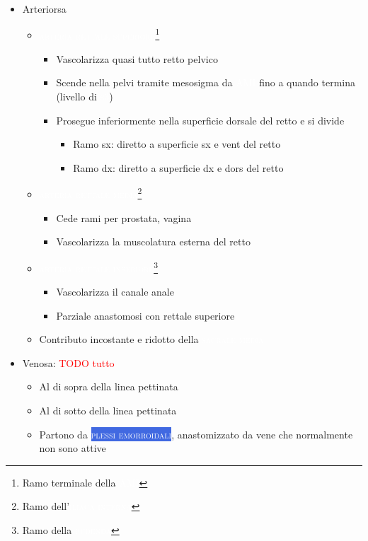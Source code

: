 \documentclass[italian,]{article}
\providecommand{\tightlist}{%
  \setlength{\itemsep}{0pt}\setlength{\parskip}{0pt}}
\newcommand{\oss}[1]{\colorbox{ossa}{\textcolor{white}{\textsc{#1}}}}
\newcommand{\ven}[1]{\colorbox{RoyalBlue}{\textcolor{white}{\textsc{#1}}}}
\newcommand{\art}[1]{\colorbox{RedOrange}{\textcolor{white}{\textsc{#1}}}}
\newcommand{\TODO}[1]{\textcolor{red}{\textsf{\footnotesize{TODO #1}}}} %
\begin{document}
\begin{itemize}
\tightlist
\item
  Arteriorsa

  \begin{itemize}
  \tightlist
  \item
    \art{arteria rettale superiore}\footnote{Ramo terminale della
      \art{AMI}}

    \begin{itemize}
    \tightlist
    \item
      Vascolarizza quasi tutto retto pelvico
    \item
      Scende nella pelvi tramite mesosigma da \art{AMI} fino a quando
      termina (livello di \oss{s3})
    \item
      Prosegue inferiormente nella superficie dorsale del retto e si
      divide

      \begin{itemize}
      \tightlist
      \item
        Ramo sx: diretto a superficie sx e vent del retto
      \item
        Ramo dx: diretto a superficie dx e dors del retto
      \end{itemize}
    \end{itemize}
  \item
    \art{arteria rettale media}\footnote{Ramo dell'\art{iliaca interna}}

    \begin{itemize}
    \tightlist
    \item
      Cede rami per prostata, vagina
    \item
      Vascolarizza la muscolatura esterna del retto
    \end{itemize}
  \item
    \art{arteria rettale inferiore}\footnote{Ramo della \art{pudenda}}

    \begin{itemize}
    \tightlist
    \item
      Vascolarizza il canale anale
    \item
      Parziale anastomosi con rettale superiore
    \end{itemize}
  \item
    Contributo incostante e ridotto della \art{sacrale media}
  \end{itemize}
\item
  Venosa: \TODO{tutto}

  \begin{itemize}
  \tightlist
  \item
    Al di sopra della linea pettinata
  \item
    Al di sotto della linea pettinata
  \item
    Partono da \ven{plessi emorroidali}, anastomizzato da vene che
    normalmente non sono attive


\end{itemize}
\end{itemize}
\end{document}
